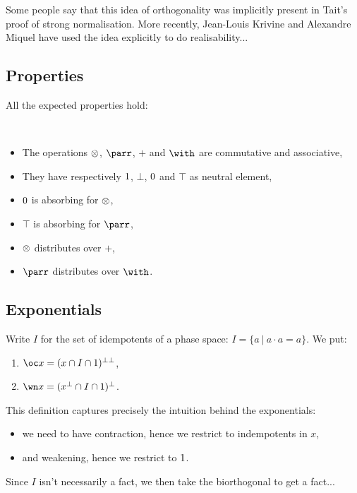 \begin{remark}
Some people say that this idea of orthogonality was implicitly present in Tait's proof of strong normalisation. More recently, Jean-Louis Krivine and Alexandre Miquel have used the idea explicitly to do realisability...
\end{remark}

\subsection{Properties}\label{properties}

All the expected properties hold:

\begin{lemma}\
\begin{itemize}
\item The operations $\otimes$, $\parr$, $\plus$ and $\with$ are commutative and associative,
\item They have respectively $1$, $\bot$, $0$ and $\top$ as neutral element,
\item $0$ is absorbing for $\otimes$,
\item $\top$ is absorbing for $\parr$,
\item $\otimes$ distributes over $\plus$,
\item $\parr$ distributes over $\with$.
\end{itemize}
\end{lemma}

\subsection{Exponentials}\label{exponentials-3}

\begin{definition}[Exponentials]
Write $I$ for the set of idempotents of a phase space: $I=\{a\ |\ a\cdot a=a\}$. We put:
\begin{enumerate}
\item $\oc x = (x\cap I\cap \one)\biorth$,
\item $\wn x = (x\orth\cap I\cap\one)\orth$.
\end{enumerate}
\end{definition}

This definition captures precisely the intuition behind the exponentials:
\begin{itemize}
\item we need to have contraction, hence we restrict to indempotents in \(x\),
\item and weakening, hence we restrict to \(1\).
\end{itemize}
Since \(I\) isn't necessarily a fact, we then take the biorthogonal to get a fact...

